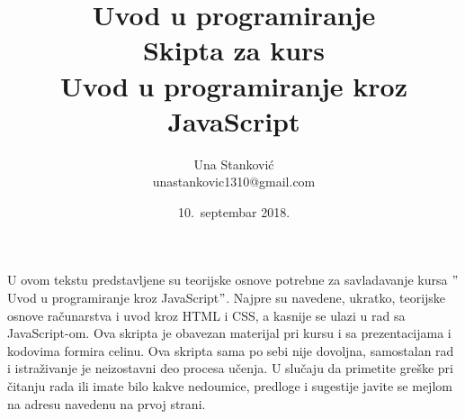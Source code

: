 \documentclass[a4paper]{article}
\begin{document}
\title{Uvod u programiranje\\ \small{Skipta za kurs\\Uvod u programiranje kroz JavaScript\\}}

\author{Una Stanković\\ unastankovic1310@gmail.com}
\date{10.~septembar 2018.}
\maketitle
\newpage

U ovom tekstu predstavljene su teorijske osnove potrebne za savladavanje kursa $"$ Uvod u programiranje kroz JavaScript$"$. Najpre su navedene, ukratko, teorijske osnove računarstva i uvod kroz HTML i CSS, a kasnije se ulazi u rad sa JavaScript-om.  Ova skripta je obavezan materijal pri kursu i sa prezentacijama i kodovima formira celinu. Ova skripta sama po sebi nije dovoljna, samostalan rad i istraživanje je neizostavni deo procesa učenja. U slučaju da primetite greške pri čitanju rada ili imate bilo kakve nedoumice, predloge i sugestije javite se mejlom na adresu navedenu na prvoj strani.

\newpage

\tableofcontents

\newpage
\end{document}
